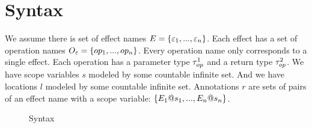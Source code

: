 {\section{Syntax}
We assume there is set of effect names $E = \{ \varepsilon_1, ..., \varepsilon_n \}$.
Each effect has a set of operation names $O_\varepsilon = \{ op_1, ..., op_n \}$.
Every operation name only corresponds to a single effect.
Each operation has a parameter type $\tau^1_{op}$ and a return type $\tau^2_{op}$.
We have scope variables $s$ modeled by some countable infinite set.
And we have locations $l$ modeled by some countable infinite set.
Annotations $r$ are sets of pairs of an effect name with a scope variable: $\{ E_1@s_1, ..., E_n@s_n \}$.
\\
\begin{figure}
\caption{Syntax}
\centering
{}
\end{figure}}
